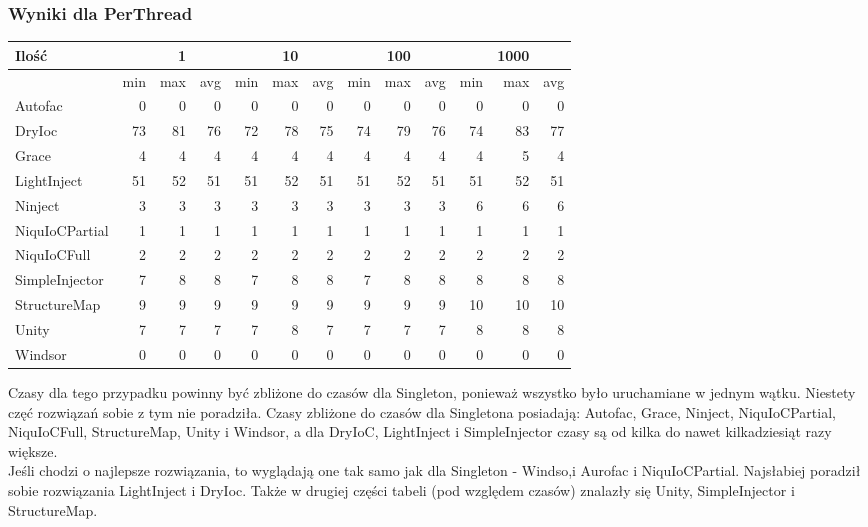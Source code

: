 \documentclass[12pt]{article}
\begin{document}
\subsubsection{Wyniki dla PerThread}
\begin{center}
\begin{small}
	\begin{tabular}{ | l | r r r | r r r | r r r | r r r | }
    		\hline
     		Ilość & & 1 & & & 10 & & & 100 & & & 1000 & \\ \hline
     		 & min & max & avg & min & max & avg & min & max & avg & min & max & avg \\ \hline
    		Autofac & 0 & 0 & 0 & 0 & 0 & 0 & 0 & 0 & 0 & 0 & 0 & 0 \\ \hline
   		DryIoc & 73 & 81 & 76 & 72 & 78 & 75 & 74 & 79 & 76 & 74 & 83 & 77 \\ \hline
		Grace & 4 & 4 & 4 & 4 & 4 & 4 & 4 & 4 & 4 & 4 & 5 & 4 \\ \hline
		LightInject & 51 & 52 & 51 & 51 & 52 & 51 & 51 & 52 & 51 & 51 & 52 & 51 \\ \hline
		Ninject & 3 & 3 & 3 & 3 & 3 & 3 & 3 & 3 & 3 & 6 & 6 & 6 \\ \hline
		NiquIoCPartial & 1 & 1 & 1 & 1 & 1 & 1 & 1 & 1 & 1 & 1 & 1 & 1 \\ \hline
		NiquIoCFull & 2 & 2 & 2 & 2 & 2 & 2 & 2 & 2 & 2 & 2 & 2 & 2 \\ \hline
		SimpleInjector & 7 & 8 & 8 & 7 & 8 & 8 & 7 & 8 & 8 & 8 & 8 & 8 \\ \hline
		StructureMap & 9 & 9 & 9 & 9 & 9 & 9 & 9 & 9 & 9 & 10 & 10 & 10 \\ \hline
		Unity & 7 & 7 & 7 & 7 & 8 & 7 & 7 & 7 & 7 & 8 & 8 & 8 \\ \hline
		Windsor & 0 & 0 & 0 & 0 & 0 & 0 & 0 & 0 & 0 & 0 & 0 & 0 \\
    		\hline
  	\end{tabular}
\end{small}
\end{center}
Czasy dla tego przypadku powinny być zbliżone do czasów dla Singleton, ponieważ wszystko było uruchamiane w jednym wątku. Niestety częć rozwiązań sobie z tym nie poradziła. Czasy zbliżone do czasów dla Singletona posiadają: Autofac, Grace, Ninject, NiquIoCPartial, NiquIoCFull, StructureMap, Unity i Windsor, a dla DryIoC, LightInject i SimpleInjector czasy są od kilka do nawet kilkadziesiąt razy większe.\\
Jeśli chodzi o najlepsze rozwiązania, to wyglądają one tak samo jak dla Singleton - Windso,i Aurofac i NiquIoCPartial. Najsłabiej poradził sobie rozwiązania LightInject i DryIoc. Także w drugiej części tabeli (pod względem czasów) znalazły się Unity, SimpleInjector i StructureMap.
\end{document}
